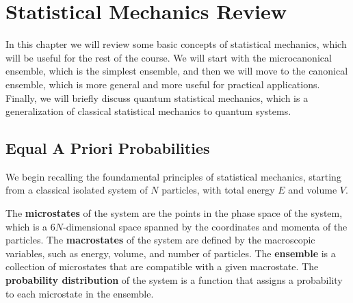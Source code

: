 \chapter{Statistical Mechanics Review}

In this chapter we will review some basic concepts of statistical mechanics, which will be useful for the rest of the course. We will start with the microcanonical ensemble, which is the simplest ensemble, and then we will move to the canonical ensemble, which is more general and more useful for practical applications. Finally, we will briefly discuss quantum statistical mechanics, which is a generalization of classical statistical mechanics to quantum systems.

\section{Equal A Priori Probabilities}

We begin recalling the foundamental principles of statistical mechanics, starting from a classical isolated system of \(N\) particles, with total energy \(E\) and volume \(V\).

The \textbf{microstates} of the system are the points in the phase space of the system, which is a \(6N\)-dimensional space spanned by the coordinates and momenta of the particles. The \textbf{macrostates} of the system are defined by the macroscopic variables, such as energy, volume, and number of particles. The \textbf{ensemble} is a collection of microstates that are compatible with a given macrostate. The \textbf{probability distribution} of the system is a function that assigns a probability to each microstate in the ensemble.

